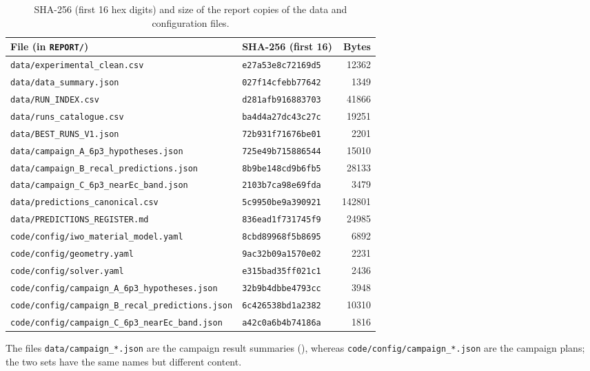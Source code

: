 \begin{table}[htbp]
\centering
\small
\caption{SHA-256 (first 16 hex digits) and size of the report copies of the data and configuration files.}
\label{tab:repro-hashes}
\begin{tabular}{@{}llr@{}}
\toprule
File (in \texttt{REPORT/}) & SHA-256 (first 16) & Bytes \\
\midrule
\texttt{data/experimental\_clean.csv} & \texttt{e27a53e8c72169d5} & 12362 \\
\texttt{data/data\_summary.json} & \texttt{027f14cfebb77642} & 1349 \\
\texttt{data/RUN\_INDEX.csv} & \texttt{d281afb916883703} & 41866 \\
\texttt{data/runs\_catalogue.csv} & \texttt{ba4d4a27dc43c27c} & 19251 \\
\texttt{data/BEST\_RUNS\_V1.json} & \texttt{72b931f71676be01} & 2201 \\
\texttt{data/campaign\_A\_6p3\_hypotheses.json} & \texttt{725e49b715886544} & 15010 \\
\texttt{data/campaign\_B\_recal\_predictions.json} & \texttt{8b9be148cd9b6fb5} & 28133 \\
\texttt{data/campaign\_C\_6p3\_nearEc\_band.json} & \texttt{2103b7ca98e69fda} & 3479 \\
\texttt{data/predictions\_canonical.csv} & \texttt{5c9950be9a390921} & 142801 \\
\texttt{data/PREDICTIONS\_REGISTER.md} & \texttt{836ead1f731745f9} & 24985 \\
\texttt{code/config/iwo\_material\_model.yaml} & \texttt{8cbd89968f5b8695} & 6892 \\
\texttt{code/config/geometry.yaml} & \texttt{9ac32b09a1570e02} & 2231 \\
\texttt{code/config/solver.yaml} & \texttt{e315bad35ff021c1} & 2436 \\
\texttt{code/config/campaign\_A\_6p3\_hypotheses.json} & \texttt{32b9b4dbbe4793cc} & 3948 \\
\texttt{code/config/campaign\_B\_recal\_predictions.json} & \texttt{6c426538bd1a2382} & 10310 \\
\texttt{code/config/campaign\_C\_6p3\_nearEc\_band.json} & \texttt{a42c0a6b4b74186a} & 1816 \\
\bottomrule
\end{tabular}
\end{table}

The files \texttt{data/campaign\_*.json} are the campaign result summaries (), whereas
\texttt{code/config/campaign\_*.json} are the campaign plans; the two sets have the same names but different content.

